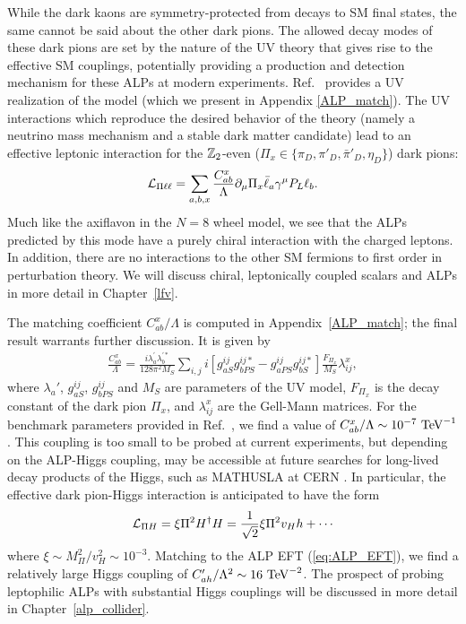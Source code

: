 {While the dark kaons are symmetry-protected from decays to SM final states, the same cannot be said about the other dark pions. The allowed decay modes of these dark pions are set by the nature of the UV theory that gives rise to the effective SM couplings, potentially providing a production and detection mechanism for these ALPs at modern experiments. Ref.~\cite{Davoudiasl:2017zws} provides a UV realization of the model (which we present in Appendix \ref{ALP_match}). The UV interactions which reproduce the desired behavior of the theory (namely a neutrino mass mechanism and a stable dark matter candidate) lead to an effective leptonic interaction for the ${\Bbb Z}_2$-even ($\Pi_x \in \{\pi_D, \pi'_D, \bar{\pi}'_D, \eta_D\}$) dark pions:
\begin{align}
    {\cal L}_{\rm \Pi\ell\ell} = \sum_{a,b,x}\frac{C_{ab}^x}{\Lambda}\partial_\mu \Pi_x\bar{\ell}_a \gamma^\mu P_L\ell_b.\label{eq:dark_pion_int}
\end{align}
Much like the axiflavon in the $N=8$ wheel model, we see that the ALPs predicted by this mode have a purely chiral interaction with the charged leptons. In addition, there are no interactions to the other SM fermions to first order in perturbation theory.  We will discuss chiral, leptonically coupled scalars and ALPs in more detail in Chapter~\ref{lfv}.

The matching coefficient $C_{ab}^x/\Lambda$ is computed in Appendix~\ref{ALP_match}; the final result warrants further discussion. It is given by
\begin{align}
    \frac{C_{ab}^x}{\Lambda} = \frac{i\lambda_a^\prime\lambda_b^{\prime*}}{128\pi^2M_S}\sum_{i,j}i\left[g_{aS}^{ij}g_{bPS}^{ij*} - g_{aPS}^{ij}g_{bS}^{ij*}\right]\frac{F_{\Pi_x}}{M_S}\lambda_{ij}^x,
\end{align}
where $\lambda_a'$, $g_{aS}^{ij}$, $g_{bPS}^{ij}$ and $M_S$ are parameters of the UV model, $F_{\Pi_x}$ is the decay constant of the dark pion $\Pi_x$, and $\lambda_{ij}^x$ are the Gell-Mann matrices. For the benchmark parameters provided in Ref.~\cite{Davoudiasl:2017zws}, we find a value of $C_{ab}^x/\Lambda \sim 10^{-7}~{\rm TeV}^{-1}$. This coupling is too small to be probed at current experiments, but depending on the ALP-Higgs coupling, may be accessible at future searches for long-lived decay products of the Higgs, such as MATHUSLA at CERN \cite{MATHUSLA:2025eth}. In particular, the effective dark pion-Higgs interaction is anticipated to have the form
\begin{align}
    {\cal L}_{\Pi H} = \xi \Pi^2 H^\dagger H = \frac{1}{\sqrt{2}}\xi \Pi^2 v_H h + \cdots \label{eq:dark_pion_Higgs}
\end{align}
where $\xi \sim M_\Pi^2 / v_H^2 \sim 10^{-3}$. Matching to the ALP EFT (\ref{eq:ALP_EFT}), we find a relatively large Higgs coupling of $C_{ah}'/\Lambda^2 \sim 16~{\rm TeV}^{-2}$. The prospect of probing leptophilic ALPs with substantial Higgs couplings will be discussed in more detail in Chapter~\ref{alp_collider}.

}
